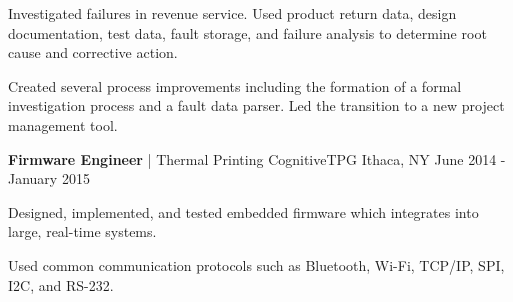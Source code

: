 \begin{cventries}
{\begin{cvitemstwo}
        \item {Investigated failures in revenue service. Used product return data, design documentation, test data, fault storage, and failure analysis to determine root cause and corrective action.}
        \item {Created several process improvements including the formation of a formal investigation process and a fault data parser. Led the transition to a new project management tool.}
      \end{cvitemstwo}
    }
  \cventry
    {\textbf{Firmware Engineer} | Thermal Printing}
    {CognitiveTPG}
    {Ithaca, NY}
    {June 2014 - January 2015}
    {
      \begin{cvitems}
        \item {Designed, implemented, and tested embedded firmware which integrates into large, real-time systems.}
        \item {Used common communication protocols such as Bluetooth, Wi-Fi, TCP/IP, SPI, I2C, and RS-232.}
      \end{cvitems}
    }
\end{cventries}